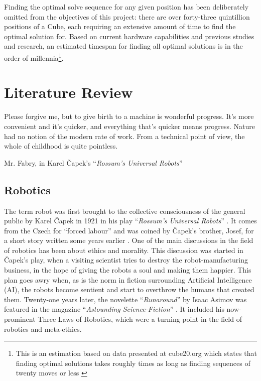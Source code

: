 \documentclass{report}
\newcommand{\tit}[1]{\textit{#1}}
\newcommand{\propernoun}[1]{\enquote{\tit{#1}}}
\begin{document}
    Finding the optimal solve sequence for any given position has been deliberately omitted from the objectives of this project: there are over forty-three quintillion positions of a Cube, each requiring an extensive amount of time to find the optimal solution for. Based on current hardware capabilities and previous studies and research, an estimated timespan for finding all optimal solutions is in the order of millennia\footnote{This is an estimation based on data presented at cube20.org which states that finding optimal solutions takes roughly  times as long as finding sequences of twenty moves or less \cite{Rokicki2010}}.
    
    \newpage
    \chapter{Literature Review}
    \epigraph{Please forgive me, but to give birth to a machine is wonderful progress. It's more convenient and it's quicker, and everything that's quicker means progress. Nature had no notion of the modern rate of work. From a technical point of view, the whole of childhood is quite pointless.}{Mr. Fabry, in Karel \v{C}apek's \propernoun{Rossum's Universal Robots} \cite{Capek1921}}
    
    \section{Robotics}
    The term robot was first brought to the collective consciousness of the general public by Karel \v{C}apek in 1921 in his play \propernoun{Rossum's Universal Robots} \cite{Capek1921}. It comes from the Czech for \enquote{forced labour} and was coined by \v{C}apek's brother, Josef, for a short story written some years earlier \cite{Etymonline2017}. One of the main discussions in the field of robotics has been about ethics and morality. This discussion was started in \v{C}apek's play, when a visiting scientist tries to destroy the robot-manufacturing business, in the hope of giving the robots a soul and making them happier. This plan goes awry when, as is the norm in fiction surrounding Artificial Intelligence (AI), the robots become sentient and start to overthrow the humans that created them. Twenty-one years later, the novelette \propernoun{Runaround} by Isaac Asimov was featured in the magazine \propernoun{Astounding Science-Fiction} \cite{Asimov1942}. It included his now-prominent Three Laws of Robotics, which were a turning point in the field of robotics and meta-ethics.
    
\end{document}
